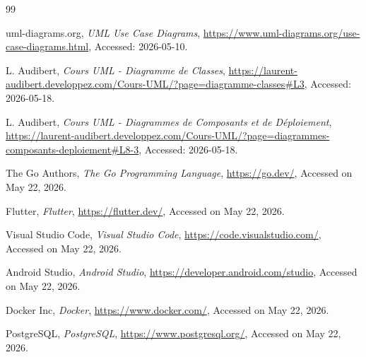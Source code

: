 \documentclass[12pt,a4paper]{report}
\begin{document}
\begin{thebibliography}{99}

uml-diagrams.org,
\textit{UML Use Case Diagrams},
\url{https://www.uml-diagrams.org/use-case-diagrams.html},
Accessed: 2026-05-10.

L. Audibert,
\textit{Cours UML - Diagramme de Classes},
\url{https://laurent-audibert.developpez.com/Cours-UML/?page=diagramme-classes#L3},
Accessed: 2026-05-18.

L. Audibert,
\textit{Cours UML - Diagrammes de Composants et de Déploiement},
\url{https://laurent-audibert.developpez.com/Cours-UML/?page=diagrammes-composants-deploiement#L8-3},
Accessed: 2026-05-18.

The Go Authors,
\textit{The Go Programming Language},
\url{https://go.dev/},
Accessed on May 22, 2026.

Flutter,
\textit{Flutter},
\url{https://flutter.dev/},
Accessed on May 22, 2026.

Visual Studio Code,
\textit{Visual Studio Code},
\url{https://code.visualstudio.com/},
Accessed on May 22, 2026.

Android Studio,
\textit{Android Studio},
\url{https://developer.android.com/studio},
Accessed on May 22, 2026.

Docker Inc,
\textit{Docker},
\url{https://www.docker.com/},
Accessed on May 22, 2026.

PostgreSQL,
\textit{PostgreSQL},
\url{https://www.postgresql.org/},
Accessed on May 22, 2026.

\end{thebibliography}
\end{document}
